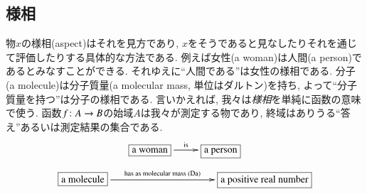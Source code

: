 
\subsection{様相}\label{sec:aspects}


物$x$の様相(aspect)はそれを見方であり, $x$をそうであると見なしたりそれを通じて評価したりする具体的な方法である. 例えば女性(a woman)は人間(a person)であるとみなすことができる. それゆえに``人間である''は女性の様相である. 分子(a molecule)は分子質量(a molecular mass, 単位はダルトン)を持ち, よって``分子質量を持つ''は分子の様相である. 言いかえれば, 我々は\emph{様相}を単純に函数の意味で使う. 函数$f\colon A\rightarrow B$の始域$A$は我々が測定する物であり, 終域はありうる``答え''あるいは測定結果の集合である.
\begin{align}\label{dia:aspect 1}\xymatrixnocompile{\fbox{a woman}\LA{r}{is}&\fbox{a person}}\end{align}\begin{align}\label{dia:aspect 2}\xymatrixnocompile{\fbox{a molecule}\LA{rr}{has as molecular mass (Da)}&\hspace{.7in}&\fbox{a positive real number}}\end{align}

